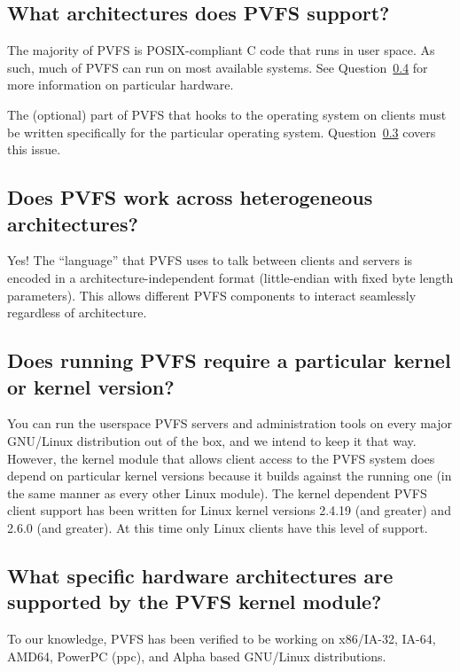 \documentclass[11pt,letterpaper]{article}
\begin{document}
\subsection{What architectures does PVFS support?}
\label{sec:supported-architectures}

The majority of PVFS is POSIX-compliant C code that runs in user
space.  As such, much of PVFS can run on most available systems.  See
Question~\ref{sec:supported-hw} for more information on particular
hardware.

The (optional) part of PVFS that hooks to the operating system on
clients must be written specifically for the particular operating
system.  Question~\ref{sec:kernel-version} covers this issue.

\subsection{Does PVFS work across heterogeneous architectures?}

Yes!  The ``language'' that PVFS uses to talk between clients and
servers is encoded in a architecture-independent format (little-endian
with fixed byte length parameters).  This allows different PVFS
components to interact seamlessly regardless of architecture.

\subsection{Does running PVFS require a particular kernel or kernel
            version?}
\label{sec:kernel-version}

You can run the userspace PVFS servers and administration tools on
every major GNU/Linux distribution out of the box, and we intend to
keep it that way.
%
However, the kernel module that allows client access to the PVFS system
does depend on particular kernel versions because it builds against
the running one (in the same manner as every other Linux module).
The kernel dependent PVFS client support has been written for Linux
kernel versions 2.4.19 (and greater) and 2.6.0 (and greater).  At this
time only Linux clients have this level of support.

\subsection{What specific hardware architectures are supported by the
            PVFS kernel module?}
\label{sec:supported-hw}

To our knowledge, PVFS has been verified to be working on x86/IA-32,
IA-64, AMD64, PowerPC (ppc), and Alpha based GNU/Linux distributions.
\end{document}
